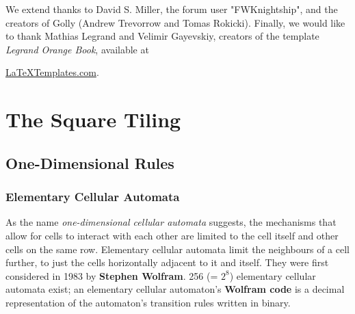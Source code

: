 \documentclass[
	11pt, %
	fleqn, %
	a4paper, %
]{LegrandOrangeBook}
\begin{document}
We extend thanks to David S. Miller, the forum user "FWKnightship", and  the creators of Golly (Andrew Trevorrow and Tomas Rokicki). Finally, we would like to thank Mathias Legrand and Velimir Gayevskiy, creators of the template \textit{Legrand Orange Book}, available at {\href{https://www.latextemplates.com/template/legrand-orange-book}{LaTeXTemplates.com}.

\mainmatter

\part{The Square Tiling}
\chapterspaceabove{6.75cm} %
\chapterspacebelow{7.25cm} %
\chapter{One-Dimensional Rules}
\section{Elementary Cellular Automata}
As the name \textit{one-dimensional cellular automata} suggests, the mechanisms that allow for cells to interact with each other are limited to the cell itself and other cells on the same row. Elementary cellular automata limit the neighbours of a cell further, to just the cells horizontally adjacent to it and itself. They were first considered in 1983 by \textbf{Stephen Wolfram}. 256 (= $2^8$) elementary cellular automata exist; an elementary cellular automaton's \textbf{Wolfram code} is a decimal representation of the automaton's transition rules written in binary.
\chapterspaceabove{6.75cm} %
\chapterspacebelow{7.25cm} %
}
\end{document}
